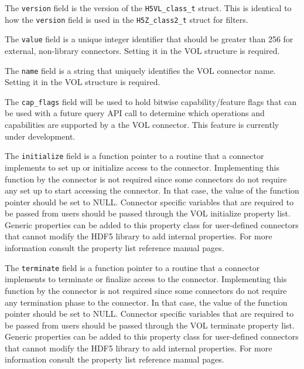 The \texttt{version} field is the version of the \texttt{H5VL\_class\_t} struct. This is identical to how the \texttt{version} field is used in the \texttt{H5Z\_class2\_t} struct for filters. 

The \texttt{value} field is a unique integer identifier that should be greater than 256 for external, non-library connectors. Setting it in the VOL structure is required.

The \texttt{name} field is a string that uniquely identifies the VOL connector name. Setting it in the VOL structure is required.

The \texttt{cap\_flags} field will be used to hold bitwise capability/feature flags that can be used with a future query API call to determine which operations and capabilities are supported by a the VOL connector. This feature is currently under development.

The \texttt{initialize} field is a function pointer to a routine that a connector implements to set up or initialize access to the connector. Implementing this function by the connector is not required since some connectors do not require any set up to start accessing the connector. In that case, the value of the function pointer should be set to NULL. Connector specific variables that are required to be passed from users should be passed through the VOL initialize property list. Generic properties can be added to this property class for user-defined connectors that cannot modify the HDF5 library to add internal properties. For more information consult the property list reference manual pages.

The \texttt{terminate} field is a function pointer to a routine that a connector implements to terminate or finalize access to the connector. Implementing this function by the connector is not required since some connectors do not require any termination phase to the connector. In that case, the value of the function pointer should be set to NULL. Connector specific variables that are required to be passed from users should be passed through the VOL terminate property list. Generic properties can be added to this property class for user-defined connectors that cannot modify the HDF5 library to add internal properties. For more information consult the property list reference manual pages.

